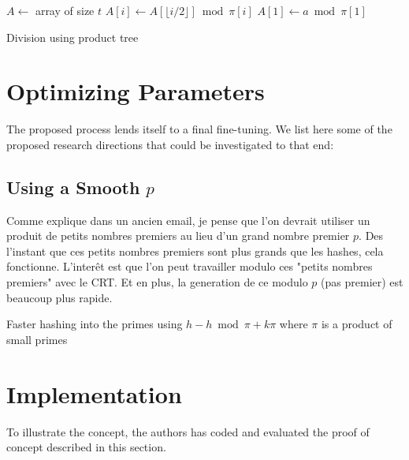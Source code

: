 \documentclass[11pt]{llncs}
\begin{document}
\begin{algorithm}
\newcommand{\vstart}{\ensuremath{\mathrm{start}}}
\newcommand{\vmid}{\ensuremath{\mathrm{mid}}}
\newcommand{\vend}{\ensuremath{\mathrm{end}}}
\begin{algorithmic}[1]
\State $A \gets $ array of size $t$
    \State $A[i] \gets A[\lfloor i/2 \rfloor] \bmod \pi[i]$
    \State {}
    \State {}
  \EndIf
\EndFunction
\State $A[1] \gets a \bmod \pi[1]$
\State {}
\State {}
\end{algorithmic}
\caption{Division using product tree}\label{alg:div-prod-tree}
\end{algorithm}

\section{Optimizing Parameters}

The proposed process lends itself to a final fine-tuning. We list here some of the proposed research directions that could be investigated to that end:

\subsection{Using a Smooth $p$}

Comme explique dans un ancien email, je pense que l'on devrait utiliser un produit de petits nombres premiers au lieu d'un grand nombre premier $p$. Des l'instant que ces petits nombres premiers sont plus grands que les hashes, cela fonctionne. L'interêt est que l'on peut travailler modulo ces "petits nombres premiers" avec le CRT. Et en plus, la generation de ce modulo $p$ (pas premier) est beaucoup plus rapide.

Faster hashing into the primes using $h-h \bmod \pi + k \pi$ where $\pi$ is a product of small primes

\section{Implementation}

To illustrate the concept, the authors has coded and evaluated the proof of concept described in this section.\smallskip
\end{document}
